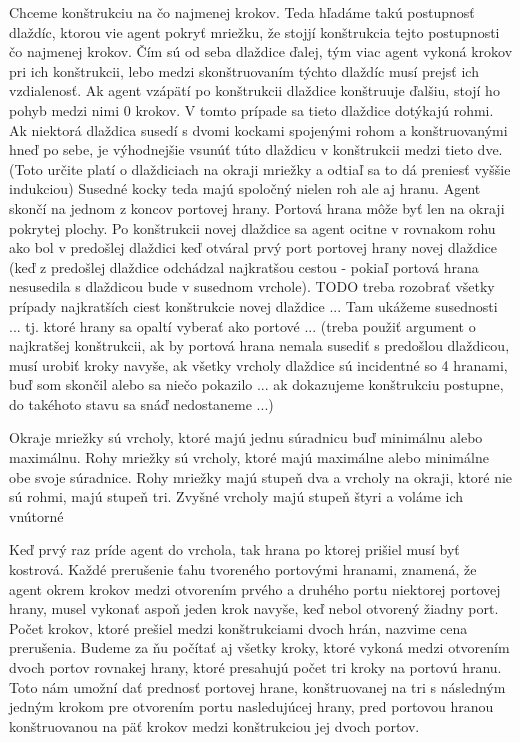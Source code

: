 Chceme konštrukciu na čo najmenej krokov. Teda hľadáme takú postupnosť
dlaždíc, ktorou vie agent pokryť mriežku, že stojjí konštrukcia tejto
postupnosti čo najmenej krokov.
Čím sú od seba dlaždice ďalej, tým viac agent vykoná krokov pri ich
konštrukcii, lebo medzi skonštruovaním týchto dlaždíc musí prejsť ich
vzdialenosť.
Ak agent vzápätí po konštrukcii dlaždice konštruuje ďalšiu, stojí ho pohyb
medzi nimi 0 krokov. V tomto prípade sa tieto dlaždice dotýkajú rohmi.
Ak niektorá dlaždica susedí s dvomi kockami spojenými rohom a konštruovanými
hneď po sebe, je výhodnejšie vsunúť túto dlaždicu v konštrukcii medzi tieto
dve. (Toto určite platí o dlaždiciach na okraji mriežky a odtiaľ sa to dá
preniesť vyššie indukciou)
Susedné kocky teda majú spoločný nielen roh ale aj hranu. Agent skončí na
jednom z koncov portovej hrany. Portová hrana môže byť len na okraji
pokrytej plochy.
Po konštrukcii novej dlaždice sa agent ocitne v rovnakom rohu ako bol v
predošlej dlaždici keď otváral prvý port portovej hrany novej dlaždice (keď
z predošlej dlaždice odchádzal najkratšou cestou - pokiaľ portová hrana
nesusedila s dlaždicou bude v susednom vrchole).
TODO treba rozobrať všetky prípady najkratších ciest konštrukcie novej
dlaždice ...
Tam ukážeme susednosti ... tj. ktoré hrany sa opaltí vyberať ako portové ...
(treba použiť argument o najkratšej konštrukcii, ak by portová hrana nemala
susediť s predošlou dlaždicou, musí urobiť kroky navyše, ak všetky vrcholy
dlaždice sú incidentné so 4 hranami, buď som skončil alebo sa niečo pokazilo
... ak dokazujeme konštrukciu postupne, do takéhoto stavu sa snáď
nedostaneme ...) 
\fi
\begin{ozn}
Okraje mriežky sú vrcholy, ktoré majú jednu súradnicu buď minimálnu alebo
maximálnu. Rohy mriežky sú vrcholy, ktoré majú maximálne alebo minimálne obe
svoje súradnice.
Rohy mriežky majú stupeň dva a vrcholy na okraji, ktoré nie sú rohmi, majú
stupeň tri.
Zvyšné vrcholy majú stupeň štyri a voláme ich vnútorné
\end{ozn}

Keď prvý raz príde agent do vrchola, tak hrana po ktorej prišiel musí byť
kostrová.
Každé prerušenie ťahu tvoreného portovými hranami, znamená, že agent okrem
krokov medzi otvorením prvého a druhého portu niektorej portovej hrany,
musel vykonať aspoň jeden krok navyše, keď nebol otvorený žiadny port. 
Počet krokov, ktoré prešiel medzi konštrukciami dvoch hrán, nazvime 
cena prerušenia. Budeme za ňu počítať aj všetky kroky, ktoré vykoná medzi
otvorením dvoch portov rovnakej hrany, ktoré presahujú počet tri kroky na
portovú hranu. Toto nám umožní dať prednosť portovej hrane, konštruovanej na
tri s následným jedným krokom pre otvorením portu nasledujúcej hrany, pred
portovou hranou konštruovanou na päť krokov medzi konštrukciou jej dvoch
portov.


